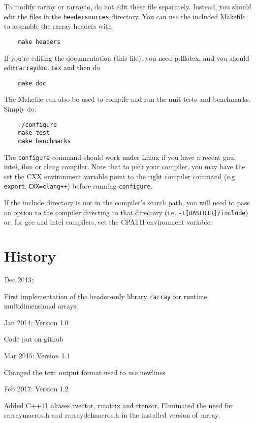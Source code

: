 \documentclass[11pt,twoside]{article}
\begin{document}
To modify rarray or rarrayio, do not edit these file
separately. Instead, you should edit the files in the
\texttt{headersources} directory.  You can use the included Makefile
to assemble the rarray headers with
\begin{verbatim}
    make headers
\end{verbatim}

If you're editing the documentation (this file), you need pdflatex, and you should edit\linebreak \texttt{rarraydoc.tex} and then do
\begin{verbatim}
    make doc
\end{verbatim}

The Makefile can also be used to compile and run the unit tests and benchmarks. Simply do:
\begin{verbatim}
    ./configure
    make test
    make benchmarks
\end{verbatim}
The \texttt{configure} command should work under Linux if you have a recent
gnu, intel, ibm or clang compiler.  Note that to pick your compiler,
you may have the set the CXX environment variable point to the right
compiler command (e.g. \texttt{export CXX=clang++}) before running \texttt{configure}.

If the include directory is not in the compiler's search path, you
will need to pass an option to the compiler directing to that
directory (i.e. \texttt{-I[BASEDIR]/include}) or, for gcc and intel compilers,
set the CPATH environment variable.

\newpage

\section{History}

Dec 2013:

First implementation of the header-only library \texttt{rarray} for runtime multidimensional arrays.

\noindent
Jan 2014: Version 1.0

Code put on github

\noindent
Mar 2015: Version 1.1

Changed the text output format used to use newlines

\noindent
Feb 2017: Version 1.2

Added C++11 aliases rvector, rmatrix and rtensor. Eliminated the need
for rarraymacros.h and rarraydelmacros.h in the installed version of
rarray.
\end{document}
